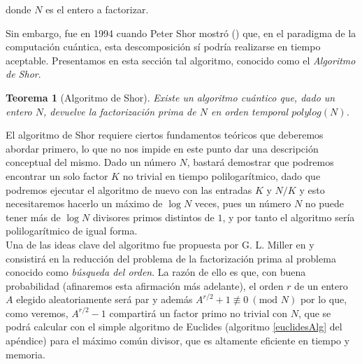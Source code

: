 \documentclass[11pt, spanish]{report}
\numberwithin{equation}{section}
\newtheorem{teo}[defin]{Teorema}
\numberwithin{defin}{section}
\newenvironment{yellowBox}{\begin{tcolorbox}[colback=yellow!5!white,colframe=yellow!75!black]}{\end{tcolorbox}}
\begin{document}
donde $N$ es el entero a factorizar.\\




Sin embargo, fue en 1994 cuando Peter Shor mostró (\cite{1995quant.ph..8027S}) que, en el paradigma de la computación cuántica, esta descomposición sí podría realizarse en tiempo aceptable. Presentamos en esta sección tal algoritmo, conocido como el \emph{Algoritmo de Shor}.\\

\begin{yellowBox}
\begin{teo}[Algoritmo de Shor]\label{Shor} 
Existe un algoritmo cuántico que, dado un entero $N$, devuelve la factorización prima de $N$ en orden temporal\footnotemark{} $polylog(N)$.
\end{teo}
\end{yellowBox}


El algoritmo de Shor requiere ciertos fundamentos teóricos que deberemos abordar primero, lo que no nos impide en este punto dar una descripción conceptual del mismo. Dado un número $N$, bastará demostrar que podremos encontrar un solo factor $K$ no trivial en tiempo polilogarítmico, dado que podremos ejecutar el algoritmo de nuevo con las entradas $K$ y $N/K$ y esto necesitaremos hacerlo un máximo de $\log N$ veces, pues un número $N$ no puede tener más de $\log N$ divisores primos distintos de $1$, y por tanto el algoritmo sería polilogarítmico de igual forma.\\

Una de las ideas clave del algoritmo fue propuesta por G. L. Miller en \cite{MILLER1976300} y consistirá en la reducción del problema de la factorización prima al problema conocido como \textit{búsqueda del orden}. La razón de ello es que, con buena probabilidad (afinaremos esta afirmación más adelante), el orden $r$ de un entero $A$ elegido aleatoriamente será par y además $A^{r/2}+1 \not\equiv 0\ (\text{mod } N)$ por lo que, como veremos, $A^{r/2}-1$ compartirá un factor primo no trivial con $N$, que se podrá calcular con el simple algoritmo de Euclides (algoritmo \ref{euclidesAlg} del apéndice) para el máximo común divisor, que es altamente eficiente en tiempo y memoria.\\
\end{document}
